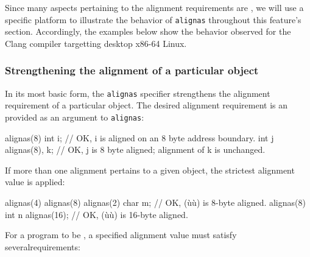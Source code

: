 Since many aspects pertaining to the alignment requirements are , we will use a specific platform to illustrate the behavior of \lstinline!alignas! throughout this feature's section.  Accordingly, the examples below show the behavior observed for the Clang compiler targetting desktop x86-64 Linux.


\subsubsection[Strengthening the alignment of a particular object]{Strengthening the alignment of a particular object}\label{restricting-the-alignment-of-a-particular-object}\label{strengthening-the-alignment-of-a-particular-object}

In its most basic form, the \lstinline!alignas! specifier strengthens the alignment requirement of a particular object. The desired alignment requirement is an  provided as an argument to \lstinline!alignas!:

\begin{emcppslisting}
alignas(8) int i;     // OK, i is aligned on an 8 byte address boundary.
int j alignas(8), k;  // OK, j is 8 byte aligned; alignment of k is unchanged.
\end{emcppslisting}

\noindent If more than one alignment pertains to a given object, the strictest alignment value is applied:

\begin{emcppslisting}
alignas(4) alignas(8) alignas(2) char m;  // OK, (ù{}ù) is 8-byte aligned.
alignas(8) int n alignas(16);             // OK, (ù{}ù) is 16-byte aligned.
\end{emcppslisting}

\noindent For a program to be , a specified alignment value
must satisfy several\linebreak[4] \mbox{requirements}:

